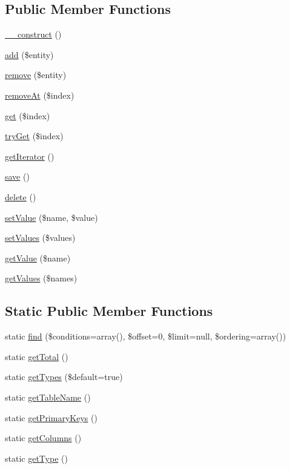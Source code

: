 \subsection*{Public Member Functions}
\begin{DoxyCompactItemize}
\item 
\hyperlink{classEntityList_ad54f70a37071343afd7cc87c01fa636e}{\_\-\_\-construct} ()
\item 
\hyperlink{classEntityList_a65960f27e39a393fb9554f725c333e12}{add} (\$entity)
\item 
\hyperlink{classEntityList_a5ec81b26c533af92dcf6af06e6b4e54e}{remove} (\$entity)
\item 
\hyperlink{classEntityList_afa9c310fb513d687dc753fe0f7e31431}{removeAt} (\$index)
\item 
\hyperlink{classEntityList_a74b902eba1e67bc6133c923a02540b37}{get} (\$index)
\item 
\hyperlink{classEntityList_a110854b1b33f521cb3c3f2f8de786177}{tryGet} (\$index)
\item 
\hyperlink{classEntityList_a2320391f82acdb29e4b68efd47081b62}{getIterator} ()
\item 
\hyperlink{classEntityList_af2c7d6e2bfa78d6af8d7357dd49e5d4b}{save} ()
\item 
\hyperlink{classEntityList_a9c027ff7f947b077129e0f4bdaaa3c08}{delete} ()
\item 
\hyperlink{classEntityList_a66784d8f928108863442c7429932c247}{setValue} (\$name, \$value)
\item 
\hyperlink{classEntityList_a041e92de11dad274df94247c3c1537c4}{setValues} (\$values)
\item 
\hyperlink{classEntityList_a740ab9d2b87a8641b47e29b80b99badc}{getValue} (\$name)
\item 
\hyperlink{classEntityList_ada2cd7ee35783d406d1d58c0814afd3e}{getValues} (\$names)
\end{DoxyCompactItemize}
\subsection*{Static Public Member Functions}
\begin{DoxyCompactItemize}
\item 
static \hyperlink{classEntityList_af892d6898641b93495db35a365bb87cd}{find} (\$conditions=array(), \$offset=0, \$limit=null, \$ordering=array())
\item 
static \hyperlink{classEntityList_a949d4cec1f470a75357a79027266ff7b}{getTotal} ()
\item 
static \hyperlink{classEntityList_a6d880dc516f006975a349b1790d7020f}{getTypes} (\$default=true)
\item 
static \hyperlink{classEntityList_a26d1917550bff1083b311ff888914f87}{getTableName} ()
\item 
static \hyperlink{classEntityList_adfac42710bce4db5b10cbd3ae4ec7714}{getPrimaryKeys} ()
\item 
static \hyperlink{classEntityList_a3a33fe428c0ff87a7555b5082aa8925a}{getColumns} ()
\item 
static \hyperlink{classEntityList_a2cdb7c626516c7aeac73f412d5cd09ce}{getType} ()
\end{DoxyCompactItemize}
